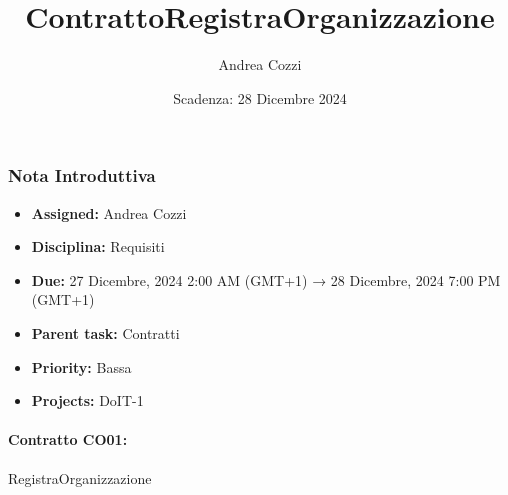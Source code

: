 \title{ContrattoRegistraOrganizzazione}
\author{Andrea Cozzi}
\date{Scadenza: 28 Dicembre 2024}

\maketitle

\subsubsection*{Nota Introduttiva}
\begin{itemize}
  \item \textbf{Assigned:} Andrea Cozzi
  \item \textbf{Disciplina:} Requisiti
  \item \textbf{Due:} 27 Dicembre, 2024 2:00 AM (GMT+1) → 28 Dicembre, 2024 7:00 PM (GMT+1)
  \item \textbf{Parent task:} Contratti
  \item \textbf{Priority:} Bassa
  \item \textbf{Projects:} DoIT-1
\end{itemize}

\vspace{1cm}

\paragraph*{Contratto \textbf{CO01}:} RegistraOrganizzazione

